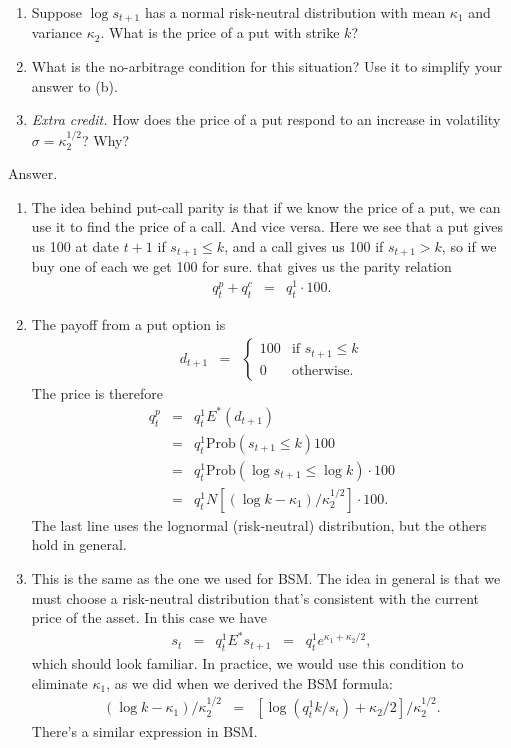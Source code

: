 \documentclass[11pt]{article}
\begin{document}
\begin{enumerate}
\begin{enumerate}
\item Suppose $\log s_{t+1}$ has a normal risk-neutral distribution
with mean $\kappa_1$ and variance $\kappa_2$.
What is the price of a put with strike $k$?

\item What is the no-arbitrage condition for this situation?
Use it to simplify your answer to (b).

\item {\it Extra credit.\/}
How does the price of a put respond to an increase in volatility
$ \sigma = \kappa_2^{1/2}$?
Why?
\end{enumerate}
%
Answer.
\begin{enumerate}
\item The idea behind put-call parity is that if we know the price of a put,
we can use it to find the price of a call.  And vice versa.
Here we see that a put gives us 100 at date $t+1$ if $s_{t+1} \leq k$,
and a call gives us 100 if $s_{t+1} > k$, so if we buy one of each we get
100 for sure.
that gives us the parity relation
\begin{eqnarray*}
    q^p_t + q^c_t &=& q^1_t \cdot 100 .
\end{eqnarray*}

\item The payoff from a put option is
\begin{eqnarray*}
    d_{t+1} &=&
        \left\{
        \begin{array}{rl}
            100    &  \mbox{if } s_{t+1} \leq k  \\
            0      &  \mbox{otherwise} .
        \end{array}
        \right.
\end{eqnarray*}
The price is therefore
\begin{eqnarray*}
    q^p_t &=& q^1_t E^* (d_{t+1})  \\
            &=& q^1_t \mbox{Prob}(s_{t+1}\leq k) 100 \\
            &=& q^1_t \mbox{Prob}(\log s_{t+1}\leq \log k) \cdot 100 \\
            &=& q^1_t N [ (\log k-\kappa_1)/\kappa_2^{1/2}] \cdot 100 .
\end{eqnarray*}
The last line uses the lognormal (risk-neutral) distribution, but
the others hold in general.

\item This is the same as the one we used for BSM.
The idea in general is that we must choose a risk-neutral distribution
that's consistent with the current price of the asset.
In this case we have
\begin{eqnarray*}
    s_t &=& q^1_t E^* s_{t+1} \;\;=\;\; q^1_t e^{\kappa_1 + \kappa_2/2} ,
\end{eqnarray*}
which should look familiar.
In practice, we would use this condition to eliminate $\kappa_1$,
as we did when we derived the BSM formula:
\begin{eqnarray*}
    (\log k - \kappa_1)/\kappa_2^{1/2} &=&
            [\log (q^1_t k/s_t) + \kappa_2/2]/\kappa_2^{1/2} .
\end{eqnarray*}
There's a similar expression in BSM.


\end{enumerate}
\end{enumerate}
\end{document}
